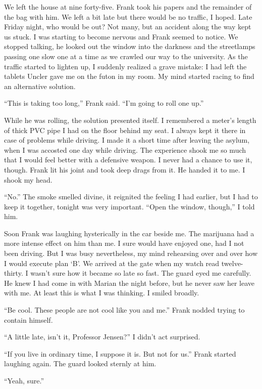 \documentclass[
]{article}
\begin{document}
We left the house at nine forty-five. Frank took his papers and the
remainder of the bag with him. We left a bit late but there would be no
traffic, I hoped. Late Friday night, who would be out? Not many, but an
accident along the way kept us stuck. I was starting to become nervous
and Frank seemed to notice. We stopped talking, he looked out the window
into the darkness and the streetlamps passing one slow one at a time as
we crawled our way to the university. As the traffic started to lighten
up, I suddenly realized a grave mistake: I had left the tablets Uncler
gave me on the futon in my room. My mind started racing to find an
alternative solution.

``This is taking too long,'' Frank said. ``I'm going to roll one up.''

While he was rolling, the solution presented itself. I remembered a
meter's length of thick PVC pipe I had on the floor behind my seat. I
always kept it there in case of problems while driving. I made it a
short time after leaving the asylum, when I was accosted one day while
driving. The experience shook me so much that I would feel better with a
defensive weapon. I never had a chance to use it, though. Frank lit his
joint and took deep drags from it. He handed it to me. I shook my head.

``No.'' The smoke smelled divine, it reignited the feeling I had
earlier, but I had to keep it together, tonight was very important.
``Open the window, though,'' I told him.

Soon Frank was laughing hysterically in the car beside me. The marijuana
had a more intense effect on him than me. I sure would have enjoyed one,
had I not been driving. But I was busy nevertheless, my mind rehearsing
over and over how I would execute plan `B'. We arrived at the gate when
my watch read twelve-thirty. I wasn't sure how it became so late so
fast. The guard eyed me carefully. He knew I had come in with Marian the
night before, but he never saw her leave with me. At least this is what
I was thinking. I smiled broadly.

``Be cool. These people are not cool like you and me.'' Frank nodded
trying to contain himself.

``A little late, isn't it, Professor Jensen?'' I didn't act surprised.

``If you live in ordinary time, I suppose it is. But not for us.'' Frank
started laughing again. The guard looked sternly at him.

``Yeah, sure.''
\end{document}
